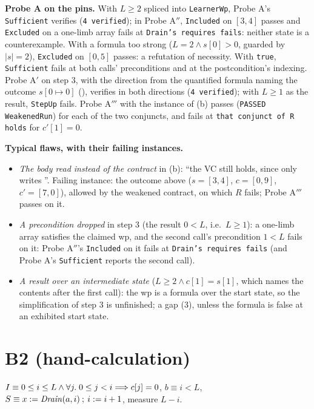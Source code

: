 \documentclass[11pt]{article}
\begin{document}
\textbf{Probe A on the pins.} With $L \geq 2$ spliced into \texttt{LearnerWp},
Probe A's \texttt{Sufficient} verifies (\texttt{4 verified}); in Probe A$''$,
\texttt{Included} on $[3, 4]$ passes and \texttt{Excluded} on a one-limb array
fails at \texttt{Drain's requires fails}: neither state is a counterexample.
With a formula too strong ($L = 2 \wedge s[0] > 0$, guarded by $|s| = 2$),
\texttt{Excluded} on $[0, 5]$ passes: a refutation of necessity. With
\texttt{true}, \texttt{Sufficient} fails at both calls' preconditions and at
the postcondition's indexing. Probe A$'$ on step 3, with the direction from
the quantified formula naming the outcome $s[0 \mapsto 0]$ (),
verifies in both directions (\texttt{4 verified}); with $L \geq 1$ as the
result, \texttt{StepUp} fails. Probe A$'''$ with the instance of (b) passes
(\texttt{PASSED WeakenedRun}) for each of the two conjuncts, and fails at
\texttt{that conjunct of R holds} for $c'[1] = 0$.

\textbf{Typical flaws, with their failing instances.}
\begin{itemize}
\item \emph{The body read instead of the contract} in (b): ``the VC still holds,
  since  only writes ''. Failing instance: the outcome
  above ($s = [3, 4]$, $c = [0, 9]$, $c' = [7, 0]$), allowed by the weakened
  contract, on which $R$ fails; Probe A$'''$ passes on it.
\item \emph{A precondition dropped} in step 3 (the result $0 < L$, i.e.\
  $L \geq 1$): a one-limb array satisfies the claimed wp, and the second
  call's precondition $1 < L$ fails on it: Probe A$''$'s \texttt{Included}
  on it fails at \texttt{Drain's requires fails} (and Probe A's
  \texttt{Sufficient} reports the second call).
\item \emph{A result over an intermediate state} ($L \geq 2 \wedge c[1] = s[1]$,
  which names the contents after the first call): the wp is a formula over
  the start state, so the simplification of step 3 is unfinished; a gap (3),
  unless the formula is false at an exhibited start state.
\end{itemize}

\section*{B2 (hand-calculation)}

$I \equiv 0 \leq i \leq L \wedge \forall j .\; 0 \leq j < i \Longrightarrow c[j] = 0$,
$b \equiv i < L$, $S \equiv x \mathrel{:=} \mathit{Drain}(a, i) \mathbin{;}\, i \mathrel{:=} i + 1$,
measure $L - i$.
\end{document}
